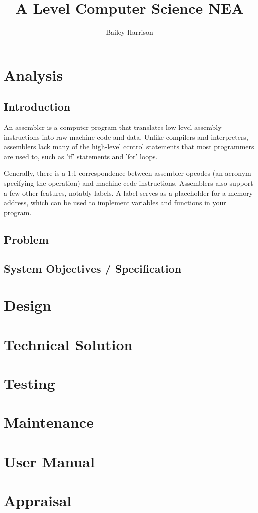 \documentclass[a4paper]{report}
\title{A Level Computer Science NEA}
\author{Bailey Harrison}
\begin{document}
\maketitle

\tableofcontents



\chapter{Analysis}

\section{Introduction}

An assembler is a computer program that translates low-level assembly instructions
into raw machine code and data. Unlike compilers and interpreters, assemblers lack
many of the high-level control statements that most programmers are used to, such
as 'if' statements and 'for' loops.

Generally, there is a 1:1 correspondence between assembler opcodes (an acronym
specifying the operation) and machine code instructions. Assemblers also support a
few other features, notably labels. A label serves as a placeholder for a memory
address, which can be used to implement variables and functions in your program.

\section{Problem}

\section{System Objectives / Specification}



\chapter{Design}



\chapter{Technical Solution}



\chapter{Testing}



\chapter{Maintenance}



\chapter{User Manual}



\chapter{Appraisal}
\end{document}
